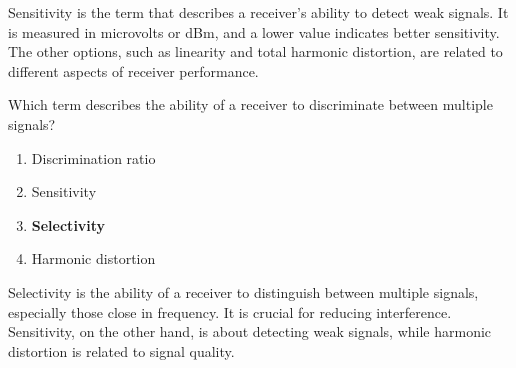 Sensitivity is the term that describes a receiver's ability to detect weak signals. It is measured in microvolts or dBm, and a lower value indicates better sensitivity. The other options, such as linearity and total harmonic distortion, are related to different aspects of receiver performance.

\begin{tcolorbox}[colback=gray!10!white,colframe=black!75!black,title={T7A04}]
    Which term describes the ability of a receiver to discriminate between multiple signals?
    \begin{enumerate}[label=\Alph*),noitemsep]
        \item Discrimination ratio
        \item Sensitivity
        \item \textbf{Selectivity}
        \item Harmonic distortion
    \end{enumerate}
\end{tcolorbox}

Selectivity is the ability of a receiver to distinguish between multiple signals, especially those close in frequency. It is crucial for reducing interference. Sensitivity, on the other hand, is about detecting weak signals, while harmonic distortion is related to signal quality.
